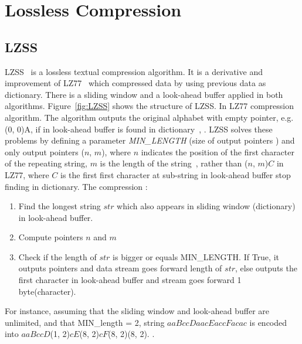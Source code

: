\section{Lossless Compression}
\subsection{LZSS}
LZSS~\cite{storer1982data} is a lossless textual compression algorithm. It is a
derivative and improvement of LZ77~\cite{ziv1977universal} which 
compressed data by using previous data as dictionary. There is a sliding window and
a look-ahead buffer applied in both algorithms. Figure~\ref{fig:LZSS} shows the
structure of LZSS. In LZ77 compression algorithm. The algorithm outputs the original
alphabet with empty pointer, e.g. (0, 0)A, if  in look-ahead buffer
is found in dictionary~\cite{ziv1977universal}, .  LZSS
solves these problems by defining a parameter \emph{MIN\_LENGTH} (size of output
pointers ) and only output pointers ($n$, $m$), where $n$ indicates the position
of the first character of the repeating string, $m$ is the length of the
string~\cite{storer1982data}, rather than ($n$, $m$)$C$ in LZ77, where $C$ is
the first first character at sub-string in look-ahead buffer stop finding in
dictionary. The compression :

\begin{enumerate}
    \item Find the longest string $str$ which also appears in sliding
    window (dictionary)  in look-ahead buffer.
    \item Compute pointers $n$ and $m$
    \item Check if the length of $str$ is bigger or equals MIN\_LENGTH. If True,
    it outputs pointers and data stream goes forward length of $str$, else
    outputs the first character in look-ahead buffer and stream goes forward 1
    byte(character).
\end{enumerate}

For instance, assuming that the sliding window and look-ahead buffer are unlimited, and that MIN\_length = 2, 
 string $aaBccDaacEaccFacac$ is
encoded into $aaBccD$(1, 2)$cE$(8, 2)$cF$(8, 2)(8, 2).   .

